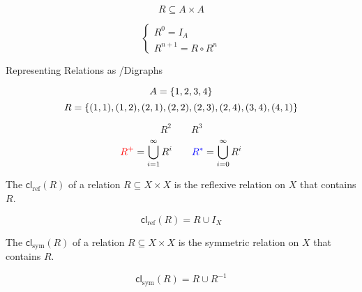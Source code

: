 
\begin{frame}{}
  \[
    R \subseteq A \times A
  \]

  \[
    \begin{cases}
      R^{0} = I_{A} \\[6pt]
      R^{n+1} = R \circ R^{n}
    \end{cases}
  \]
\end{frame}

\begin{frame}{}
  \begin{center}
    Representing Relations as /Digraphs
  \end{center}

  \[
    A = \{1, 2, 3, 4\}
  \]
  \[
    R = \{(1, 1), (1, 2), (2, 1), (2, 2), (2, 3), (2, 4), (3, 4), (4, 1)\}
  \]

  \pause
  \[
    R^{2} \qquad R^{3}
  \]
  \pause
  \[
    \textcolor{red}{R^{+}} = \bigcup_{i=1}^{\infty} R^{i} \qquad
    \textcolor{blue}{R^{\ast}} = \bigcup_{i=0}^{\infty} R^{i}
  \]
\end{frame}

\begin{frame}{}
  \begin{definition}
    The  $\textsf{cl}_{\text{ref}}(R)$
    of a relation $R \subseteq X \times X$ is
    the  reflexive relation on $X$ that contains $R$.
  \end{definition}

  \pause
  \vspace{0.50cm}
  \[
    \textsf{cl}_{\text{ref}}(R) = R \cup I_{X}
  \]
\end{frame}

\begin{frame}{}
  \begin{definition}
    The  $\textsf{cl}_{\text{sym}}(R)$
    of a relation $R \subseteq X \times X$
    is the  symmetric relation on $X$ that contains $R$.
  \end{definition}

  \pause
  \vspace{0.50cm}
  \[
    \textsf{cl}_{\text{sym}}(R) = R \cup R^{-1}
  \]
\end{frame}

